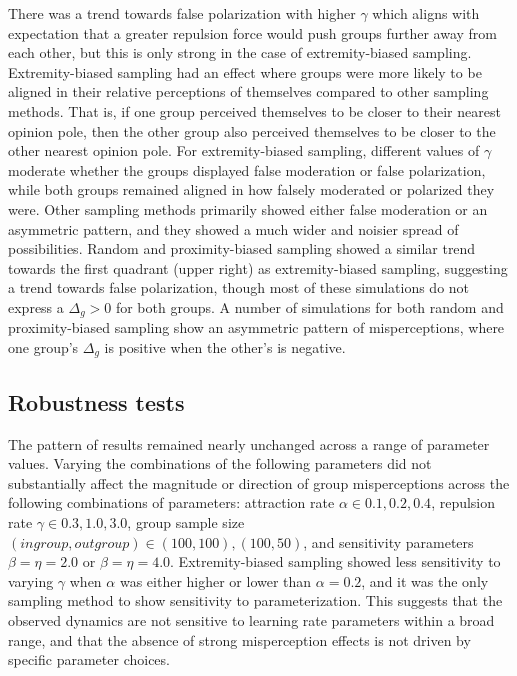 There was a trend towards false polarization with higher $\gamma$ which aligns with expectation that a greater repulsion force would push groups further away from each other, but this is only strong in the case of extremity-biased sampling. 
Extremity-biased sampling had an effect where groups were more likely to be aligned in their relative perceptions of themselves compared to other sampling methods. That is, if one group perceived themselves to be closer to their nearest opinion pole, then the other group also perceived themselves to be closer to the other nearest opinion pole. 
For extremity-biased sampling, different values of $\gamma$ moderate whether the groups displayed false moderation or false polarization, while both groups remained aligned in how falsely moderated or polarized they were. 
Other sampling methods primarily showed either false moderation or an asymmetric pattern, and they showed a much wider and noisier spread of possibilities. Random and proximity-biased sampling showed a similar trend towards the first quadrant (upper right) as extremity-biased sampling, suggesting a trend towards false polarization, though most of these simulations do not express a $\Delta_g > 0$ for both groups. A number of simulations for both random and proximity-biased sampling show an asymmetric pattern of misperceptions, where one group's $\Delta_g$ is positive when the other's is negative. 

\subsection{Robustness tests}

The pattern of results remained nearly unchanged across a range of parameter values. 
Varying the combinations of the following parameters did not substantially affect the magnitude or direction of group misperceptions across the following combinations of parameters: 
attraction rate $\alpha \in {0.1, 0.2, 0.4}$, repulsion rate $\gamma \in {0.3, 1.0, 3.0} $, group sample size $(ingroup, outgroup) \in {(100,100), (100,50)}$, and sensitivity parameters $\beta = \eta = 2.0$ or $\beta = \eta = 4.0$. 
Extremity-biased sampling showed less sensitivity to varying $\gamma$ when $\alpha$ was either higher or lower than $\alpha = 0.2$, and it was the only sampling method to show sensitivity to parameterization.
This suggests that the observed dynamics are not sensitive to learning rate parameters within a broad range, and that the absence of strong misperception effects is not driven by specific parameter choices.

